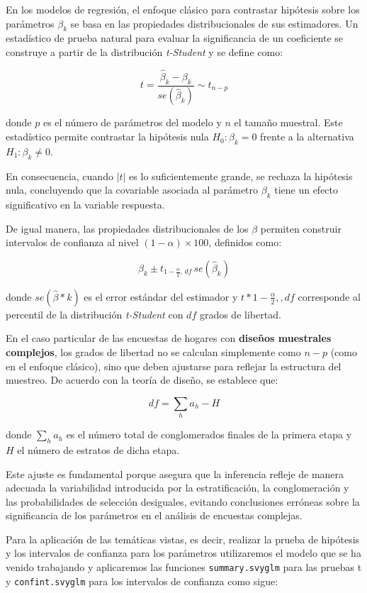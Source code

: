 \documentclass[
  spanish,
  12pt,
]{book}
\begin{document}
En los modelos de regresión, el enfoque clásico para contrastar hipótesis sobre los parámetros \(\beta_k\) se basa en las propiedades distribucionales de sus estimadores. Un estadístico de prueba natural para evaluar la significancia de un coeficiente se construye a partir de la distribución \emph{t-Student} y se define como:

\[
t=\frac{\hat{\beta}_{k}-\beta_{k}}{se\left(\hat{\beta}_{k}\right)} \sim t_{n-p}
\]

donde \(p\) es el número de parámetros del modelo y \(n\) el tamaño muestral. Este estadístico permite contrastar la hipótesis nula \(H_{0}:\beta_{k}=0\) frente a la alternativa \(H_{1}:\beta_{k}\neq 0\).

En consecuencia, cuando \(|t|\) es lo suficientemente grande, se rechaza la hipótesis nula, concluyendo que la covariable asociada al parámetro \(\beta_k\) tiene un efecto significativo en la variable respuesta.

De igual manera, las propiedades distribucionales de los \(\beta\) permiten construir intervalos de confianza al nivel \((1-\alpha)\times100%
\), definidos como:

\[
\hat{\beta}_{k}\pm t_{1-\frac{\alpha}{2},\,df}\,se\left(\hat{\beta}_{k}\right)
\]

donde \(se(\hat{\beta}*k)\) es el error estándar del estimador y \(t*{1-\frac{\alpha}{2},,df}\) corresponde al percentil de la distribución \emph{t-Student} con \(df\) grados de libertad.

En el caso particular de las encuestas de hogares con \textbf{diseños muestrales complejos}, los grados de libertad no se calculan simplemente como \(n-p\) (como en el enfoque clásico), sino que deben ajustarse para reflejar la estructura del muestreo. De acuerdo con la teoría de diseño, se establece que:

\[
df = \sum_{h} a_{h} - H
\]

donde \(\sum_{h}a_{h}\) es el número total de conglomerados finales de la primera etapa y \(H\) el número de estratos de dicha etapa.

Este ajuste es fundamental porque asegura que la inferencia refleje de manera adecuada la variabilidad introducida por la estratificación, la conglomeración y las probabilidades de selección desiguales, evitando conclusiones erróneas sobre la significancia de los parámetros en el análisis de encuestas complejas.

Para la aplicación de las temáticas vistas, es decir, realizar la prueba de hipótesis y los intervalos de confianza para los parámetros utilizaremos el modelo que se ha venido trabajando y aplicaremos las funciones \texttt{summary.svyglm} para las pruebas t y \texttt{confint.svyglm} para los intervalos de confianza como sigue:
\end{document}
